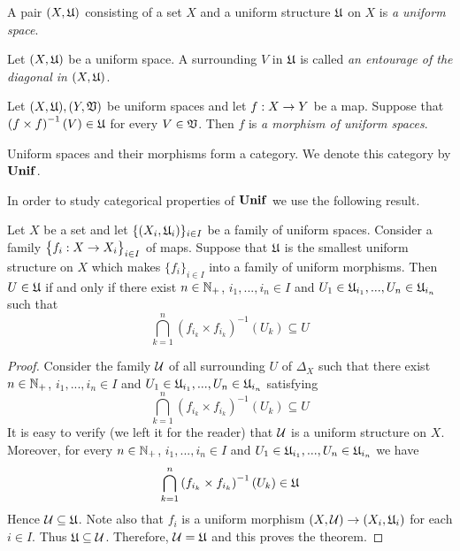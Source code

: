 \begin{definition}
A pair $(X,{\mathfrak U})$ consisting of a set $X$ and a uniform structure ${\mathfrak U}$ on $X$ is \textit{a uniform space}.
\end{definition}

\begin{definition}
Let $(X,{\mathfrak U})$ be a uniform space. A surrounding $V$ in ${\mathfrak U}$ is called \textit{an entourage of the diagonal in $(X,{\mathfrak U})$}. 
\end{definition}

\begin{definition}
Let $(X,{\mathfrak U}),(Y,{\mathfrak V})$ be uniform spaces and let $f:X\rightarrow Y$ be a map. Suppose that $\left(f\times f\right)^{-1}(V) \in {\mathfrak U}$ for every $V\in {\mathfrak V}$. Then $f$ is \textit{a morphism of uniform spaces}. 
\end{definition}

\begin{remark}\label{remark:category_of_uniform_spaces}
Uniform spaces and their morphisms form a category. We denote this category by $\mathbf{Unif}$.
\end{remark}
\noindent
In order to study categorical properties of $\mathbf{Unif}$ we use the following result.

\begin{theorem}\label{theorem:description_of_uniform_structure_introduced_by_a_family_of_maps}
Let $X$ be a set and let $\{(X_i,{\mathfrak U}_i)\}_{i\in I}$ be a family of uniform spaces. Consider a family $\big\{f_i:X\rightarrow X_i\big\}_{i\in I}$ of maps. Suppose that ${\mathfrak U}$ is the smallest uniform structure on $X$ which makes $\{f_i\}_{i\in I}$ into a family of uniform morphisms. Then $U \in {\mathfrak U}$ if and only if there exist $n\in {\mathbb N}_+$, $i_1,...,i_n\in I$ and $U_1 \in {\mathfrak U}_{i_1},...,U_n\in {\mathfrak U}_{i_n}$ such that
$$\bigcap_{k=1}^n\left(f_{i_k}\times f_{i_k}\right)^{-1}(U_k) \subseteq U$$
\end{theorem}
\begin{proof}
Consider the family ${\mathcal U}$ of all surrounding $U$ of $\Delta_X$ such that there exist $n\in {\mathbb N}_+$, $i_1,...,i_n\in I$ and $U_1 \in {\mathfrak U}_{i_1},...,U_n\in {\mathfrak U}_{i_n}$ satisfying
$$\bigcap_{k=1}^n\left(f_{i_k}\times f_{i_k}\right)^{-1}(U_k) \subseteq U$$
It is easy to verify (we left it for the reader) that ${\mathcal U}$ is a uniform structure on $X$. Moreover, for every $n\in {\mathbb N}_+$, $i_1,...,i_n\in I$ and $U_1 \in {\mathfrak U}_{i_1},...,U_n\in {\mathfrak U}_{i_n}$ we have
$$\bigcap_{k=1}^n\left(f_{i_k}\times f_{i_k}\right)^{-1}(U_k) \in {\mathfrak U}$$
Hence ${\mathcal U} \subseteq {\mathfrak U}$. Note also that $f_i$ is a uniform morphism $(X,{\mathcal U})\rightarrow (X_i,{\mathfrak U}_i)$ for each $i\in I$. Thus ${\mathfrak U} \subseteq {\mathcal U}$. Therefore, ${\mathcal U} = {\mathfrak U}$ and this proves the theorem. 
\end{proof}

